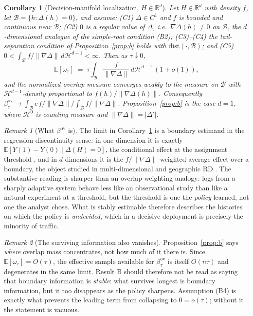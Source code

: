 \documentclass[11pt]{article}
\newtheorem{corollary}{Corollary}
\theoremstyle{definition}
\theoremstyle{remark}
\newtheorem{remark}{Remark}
\newcommand{\E}{\mathbb{E}}
\newcommand{\ov}{\mathrm{ov}}
\begin{document}
\begin{corollary}[Decision-manifold localization, $H \in \mathbb{R}^d$]
\label{cor:manifold}
Let $H \in \mathbb{R}^d$ with density $f$, let $\mathcal{B} = \{h :
\Delta(h) = 0\}$, and assume: (C1) $\Delta \in C^1$ and $f$ is bounded and
continuous near $\mathcal{B}$; (C2) $0$ is a \emph{regular value} of
$\Delta$, i.e.\ $\nabla\Delta(h) \neq 0$ on $\mathcal{B}$, the
$d$-dimensional analogue of the simple-root condition (B2); (C3)--(C4) the
tail-separation condition of Proposition~\ref{prop:b} holds with
$\mathrm{dist}(\cdot,\mathcal{B})$; and (C5) $0 < \int_{\mathcal{B}}
f/\|\nabla\Delta\| \,d\mathcal{H}^{d-1} < \infty$. Then as $\tau
\downarrow 0$,
\[
\E[\omega_\tau] \;=\; \tau \int_{\mathcal{B}}
\frac{f}{\|\nabla\Delta\|}\,d\mathcal{H}^{d-1}\,(1+o(1)),
\]
and the normalized overlap measure converges weakly to the measure on
$\mathcal{B}$ with $\mathcal{H}^{d-1}$-density proportional to
$f(h)/\|\nabla\Delta(h)\|$. Consequently $\beta^{\ov}_\tau \to
\int_{\mathcal{B}} c\,f/\|\nabla\Delta\| \big/ \int_{\mathcal{B}}
f/\|\nabla\Delta\|$. Proposition~\ref{prop:b} is the case $d=1$, where
$\mathcal{H}^{0}$ is counting measure and $\|\nabla\Delta\| = |\Delta'|$.
\end{corollary}

\begin{remark}[What $\beta^{\ov}$ is]\label{rem:rd}
The limit in Corollary~\ref{cor:manifold} is a boundary estimand in the
regression-discontinuity sense: in one dimension it is exactly $\E[Y(1) -
Y(0) \mid \Delta(H) = 0]$, the conditional effect at the assignment
threshold \citep{hahn2001identification}, and in $d$ dimensions it is the
$f/\|\nabla\Delta\|$-weighted average effect over a boundary, the object
studied in multi-dimensional and geographic RD \citep{keele2015geographic}.
The substantive reading is sharper than an overlap-weighting analogy: logs
from a sharply adaptive system behave less like an observational study than
like a natural experiment at a threshold, but the threshold is one the
\emph{policy} learned, not one the analyst chose. What is stably estimable
therefore describes the histories on which the policy is \emph{undecided},
which in a decisive deployment is precisely the minority of traffic.
\end{remark}

\begin{remark}[The surviving information also vanishes]\label{rem:bmass}
Proposition~\ref{prop:b} says \emph{where} overlap mass concentrates, not how
much of it there is. Since $\E[\omega_\tau] = O(\tau)$, the effective sample
available for $\beta^{\ov}_\tau$ is itself $O(n\tau)$ and degenerates in the
same limit. Result B should therefore not be read as saying that boundary
information is \emph{stable}: what survives longest is boundary information,
but it too disappears as the policy sharpens. Assumption (B4) is exactly what
prevents the leading term from collapsing to $0 = o(\tau)$; without it the
statement is vacuous.
\end{remark}
\end{document}
